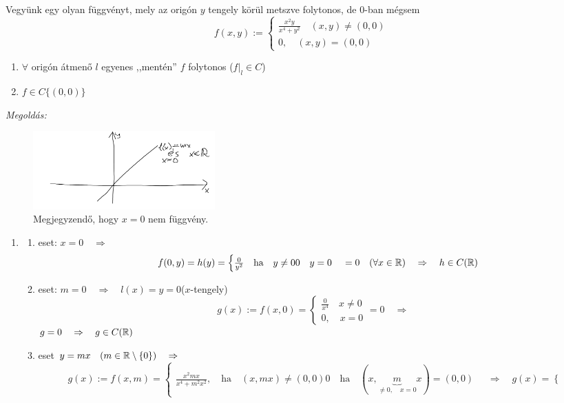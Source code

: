 \documentclass[a4paper,11.5pt]{article}
\begin{document}
	\begin{task}
		Vegyünk egy olyan függvényt, mely az origón $y$ tengely körül metszve folytonos, de 0-ban mégsem
		\[ f(x,y):=\begin{cases}
			\frac{x^2y}{x^4+y^2}\quad (x,y)\not=(0,0)\\
			0,\quad (x,y)=(0,0)
		\end{cases} \]
		\begin{enumerate}
			\item $\forall$ origón átmenő $l$ egyenes ,,mentén'' $f$ folytonos ($f|_l\in C$)
			\item $f\in C\{ (0,0) \}$
		\end{enumerate}
		\textit{Megoldás:}
		\begin{figure}[H]
			\centering
			\includegraphics[height=3cm]{kepek/26.png}
			\caption{Megjegyzendő, hogy $x=0$ nem függvény.}
		\end{figure}
		\begin{enumerate}
			\item\begin{enumerate}
				\item eset: $x=0\quad \Rightarrow\quad $
				\[ f(0,y)=h(y)=\begin{cases}
					\frac{0}{y^2}\quad \text{ha}\quad y\not=0
					0\quad y=0
				\end{cases}=0\quad (\forall x\in\mathbb{R})\quad \Rightarrow\quad h\in C(\mathbb{R}) \]
				\item eset: $m=0\quad \Rightarrow\quad l(x)=y=0$\quad ($x$-tengely)
				\[ g(x):=f(x,0)=\begin{cases}
					\frac{0}{x^4}\quad x\not=0\\
					0,\quad x=0
				\end{cases}=0\quad \Rightarrow\quad  \]
				$g=0\quad \Rightarrow\quad g\in C(\mathbb{R})$
				\item eset $y=mx\quad (m\in\mathbb{R}\setminus\{0\})\quad \Rightarrow$
				\[ g(x):=f(x,m)=\begin{cases}
					\frac{x^2mx}{x^4+m^2x^2},\quad \text{ha}\quad (x,mx)\not=(0,0)
					0\quad \text{ha}\quad (x,\underbrace{m}_{\not=0,\quad x=0}x)=(0,0)
				\end{cases}\quad \Rightarrow\quad g(x)=\begin{cases}

\end{cases}\]
\end{enumerate}
\end{enumerate}
\end{task}
\end{document}
